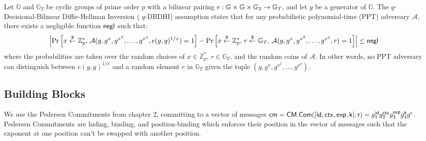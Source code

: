 \begin{definition}
Let $\mathbb{G}$ and $\mathbb{G}_T$ be cyclic groups of prime order $p$ with a bilinear pairing $e: \mathbb{G} \times \mathbb{G} \times \mathbb{G}_2 \to \mathbb{G}_T$, and let $g$ be a generator of $\mathbb{G}$. The $q$-Decisional-Bilinear Diffie-Hellman Inversion ( $q$-DBDHI) assumption states that for any probabilistic polynomial-time (PPT) adversary $\mathcal{A}$, there exists a negligible function $\mathsf{negl}$ such that:
\[
\left| \Pr\left[ x \stackrel{\$}{\leftarrow} \mathbb{Z}_p^*, \, \mathcal{A}(g, g^x, g^{x^2}, \ldots, g^{x^q}, e(g, g)^{1/x}) = 1 \right] - \Pr\left[ x \stackrel{\$}{\leftarrow} \mathbb{Z}_p^*, \, r \stackrel{\$}{\leftarrow} \mathbb{G}_T, \, \mathcal{A}(g, g^x, g^{x^2}, \ldots, g^{x^q}, r) = 1 \right] \right| \leq \mathsf{negl}
\]
where the probabilities are taken over the random choices of $x \in \mathbb{Z}_p^*$, $r \in \mathbb{G}_T$, and the random coins of $\mathcal{A}$. In other words, no PPT adversary can distinguish between $e(g, g)^{1/x}$ and a random element $r$ in $\mathbb{G}_T$ given the tuple $(g, g^x, g^{x^2}, \ldots, g^{x^q})$.
\end{definition}



\subsection{Building Blocks}
We use the Pedersen Commitments from chapter 2, committing to a vector of messages $\mathsf{cm} = \mathsf{CM.Com}([\mathsf{id}, \mathsf{ctx}, \mathsf{exp}, \mathsf{k}];\mathsf{r}) = g_1^{\mathsf{id}} g_2^{\mathsf{ctx}} g_3^{\mathsf{exp}} g_4^{\mathsf{k}} g^{\mathsf{r}}$. Pedersen Commitments are hiding, binding, and position-binding which enforces their position in the vector of messages such that the exponent at one position can't be swapped with another position. 






